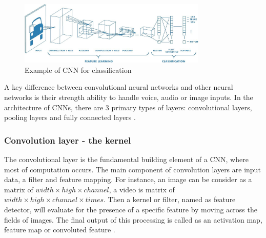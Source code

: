 \documentclass[a4paper, 12pt]{article}
\begin{document}
\begin{figure}[H]
    \centering
    \includegraphics[width=0.8\textwidth]{Example of Classification by using CNN.jpeg}
    \caption{Example of CNN for classification}
    \label{Figure CNN for classification}
\end{figure}

A key difference between convolutional neural networks and other neural networks is their strength ability to handle voice, audio or image inputs. In the architecture of CNNs, there are 3 primary types of layers:  convolutional layers, pooling layers and fully connected layers \citep{ibmConvNet}.
\subsubsection{Convolution layer - the kernel}
The convolutional layer is the fundamental building element of a CNN, where most of computation occurs. The main component of convolution layers are input data, a filter and feature mapping. For instance, an image can be consider as a matrix of \textit{$width \times high \times channel$}, a video is matrix of \textit{$width \times high \times channel \times times$}. Then a kernel or filter, named as feature detector, will evaluate for the presence of a specific feature by moving across the fields of images. The final output of this processing is called as an activation map, feature map or convoluted feature \citep{dumoulin2016guide}.
\end{document}
